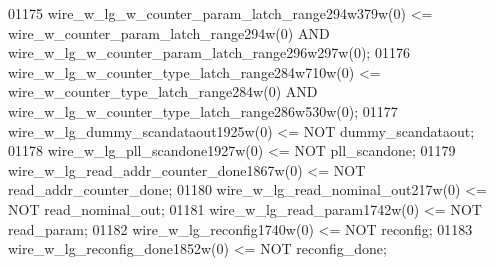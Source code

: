 \begin{DoxyCode}
{01175     \textcolor{vhdlchar}{wire_w_lg_w_counter_param_latch_range294w379w}\textcolor{vhdlchar}{(}\textcolor{vhdllogic}{}\textcolor{vhdllogic}{0}\textcolor{vhdlchar}{)} \textcolor{vhdlchar}{<=} \textcolor{vhdlchar}{
      wire_w_counter_param_latch_range294w}\textcolor{vhdlchar}{(}\textcolor{vhdllogic}{}\textcolor{vhdllogic}{0}\textcolor{vhdlchar}{)} \textcolor{keywordflow}{AND} \textcolor{vhdlchar}{
      wire_w_lg_w_counter_param_latch_range296w297w}\textcolor{vhdlchar}{(}\textcolor{vhdllogic}{}\textcolor{vhdllogic}{0}\textcolor{vhdlchar}{)};
01176     \textcolor{vhdlchar}{wire_w_lg_w_counter_type_latch_range284w710w}\textcolor{vhdlchar}{(}\textcolor{vhdllogic}{}\textcolor{vhdllogic}{0}\textcolor{vhdlchar}{)} \textcolor{vhdlchar}{<=} \textcolor{vhdlchar}{
      wire_w_counter_type_latch_range284w}\textcolor{vhdlchar}{(}\textcolor{vhdllogic}{}\textcolor{vhdllogic}{0}\textcolor{vhdlchar}{)} \textcolor{keywordflow}{AND} \textcolor{vhdlchar}{
      wire_w_lg_w_counter_type_latch_range286w530w}\textcolor{vhdlchar}{(}\textcolor{vhdllogic}{}\textcolor{vhdllogic}{0}\textcolor{vhdlchar}{)};
01177     \textcolor{vhdlchar}{wire_w_lg_dummy_scandataout1925w}\textcolor{vhdlchar}{(}\textcolor{vhdllogic}{}\textcolor{vhdllogic}{0}\textcolor{vhdlchar}{)} \textcolor{vhdlchar}{<=} \textcolor{keywordflow}{NOT} \textcolor{vhdlchar}{dummy_scandataout};
01178     \textcolor{vhdlchar}{wire_w_lg_pll_scandone1927w}\textcolor{vhdlchar}{(}\textcolor{vhdllogic}{}\textcolor{vhdllogic}{0}\textcolor{vhdlchar}{)} \textcolor{vhdlchar}{<=} \textcolor{keywordflow}{NOT} \textcolor{vhdlchar}{pll_scandone};
01179     \textcolor{vhdlchar}{wire_w_lg_read_addr_counter_done1867w}\textcolor{vhdlchar}{(}\textcolor{vhdllogic}{}\textcolor{vhdllogic}{0}\textcolor{vhdlchar}{)} \textcolor{vhdlchar}{<=} \textcolor{keywordflow}{NOT} \textcolor{vhdlchar}{read_addr_counter_done};
01180     \textcolor{vhdlchar}{wire_w_lg_read_nominal_out217w}\textcolor{vhdlchar}{(}\textcolor{vhdllogic}{}\textcolor{vhdllogic}{0}\textcolor{vhdlchar}{)} \textcolor{vhdlchar}{<=} \textcolor{keywordflow}{NOT} \textcolor{vhdlchar}{read_nominal_out};
01181     \textcolor{vhdlchar}{wire_w_lg_read_param1742w}\textcolor{vhdlchar}{(}\textcolor{vhdllogic}{}\textcolor{vhdllogic}{0}\textcolor{vhdlchar}{)} \textcolor{vhdlchar}{<=} \textcolor{keywordflow}{NOT} \textcolor{vhdlchar}{read_param};
01182     \textcolor{vhdlchar}{wire_w_lg_reconfig1740w}\textcolor{vhdlchar}{(}\textcolor{vhdllogic}{}\textcolor{vhdllogic}{0}\textcolor{vhdlchar}{)} \textcolor{vhdlchar}{<=} \textcolor{keywordflow}{NOT} \textcolor{vhdlchar}{reconfig};
01183     \textcolor{vhdlchar}{wire_w_lg_reconfig_done1852w}\textcolor{vhdlchar}{(}\textcolor{vhdllogic}{}\textcolor{vhdllogic}{0}\textcolor{vhdlchar}{)} \textcolor{vhdlchar}{<=} \textcolor{keywordflow}{NOT} \textcolor{vhdlchar}{reconfig_done};
}
\end{DoxyCode}
